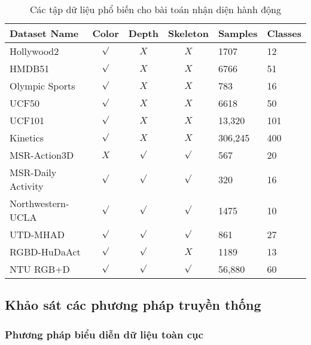 \begin{table}[!ht]
    \centering
    \begin{tabular}{|l|c|c|c|l|l|}
        \hline
        Dataset Name       & Color   & Depth   & Skeleton & Samples & Classes \\ \hline
        Hollywood2         & $\surd$ & $X$     & $X$      & 1707    & 12      \\ \hline
        HMDB51             & $\surd$ & $X$     & $X$      & 6766    & 51      \\ \hline
        Olympic Sports     & $\surd$ & $X$     & $X$      & 783     & 16      \\ \hline
        UCF50              & $\surd$ & $X$     & $X$      & 6618    & 50      \\ \hline
        UCF101             & $\surd$ & $X$     & $X$      & 13,320  & 101     \\ \hline
        Kinetics           & $\surd$ & $X$     & $X$      & 306,245 & 400     \\ \hline
        MSR-Action3D       & $X$     & $\surd$ & $\surd$  & 567     & 20      \\ \hline
        MSR-Daily Activity & $\surd$ & $\surd$ & $\surd$  & 320     & 16      \\ \hline
        Northwestern-UCLA  & $\surd$ & $\surd$ & $\surd$  & 1475    & 10      \\ \hline
        UTD-MHAD           & $\surd$ & $\surd$ & $\surd$  & 861     & 27      \\ \hline
        RGBD-HuDaAct       & $\surd$ & $\surd$ & $X$      & 1189    & 13      \\ \hline
        NTU RGB+D          & $\surd$ & $\surd$ & $\surd$  & 56,880  & 60      \\ \hline
    \end{tabular}
    \caption{Các tập dữ liệu phổ biến cho bài toán nhận diện hành động}
    \label{table:dataset-popular}
\end{table}

\subsection{Khảo sát các phương pháp truyền thống}
\label{survey:method-handcraft}

\subsubsection{Phương pháp biểu diễn dữ liệu toàn cục}


